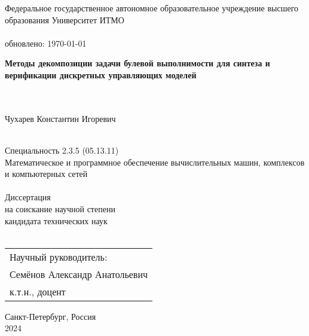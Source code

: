 \thispagestyle{empty}


\vspace{0pt plus2fill} %
\begin{center}
	Федеральное государственное автономное образовательное учреждение высшего образования Университет ИТМО \\ \ \\
	{\tiny обновлено: \today}
\end{center}

\vspace*{230pt}
\begin{center}
\textbf{\large %
Методы декомпозиции задачи булевой выполнимости для синтеза и верификации дискретных управляющих моделей
} \\ \ \\ \

{\large
Чухарев Константин Игоревич
}
\\ \

{Специальность 2.3.5 (05.13.11)} \\
{\small Математическое и программное обеспечение вычислительных машин, комплексов и компьютерных сетей} \\ \ \\
Диссертация \\ на соискание научной степени \\ кандидата технических наук \\ \ \\
\hfill\begin{tabular}{l}
Научный руководитель: \\
Семёнов Александр Анатольевич \\
к.т.н., доцент
\end{tabular}
\end{center}

\vspace{0pt plus2fill} %

\begin{center}
	Санкт-Петербург, Россия\\
	2024
\end{center}
